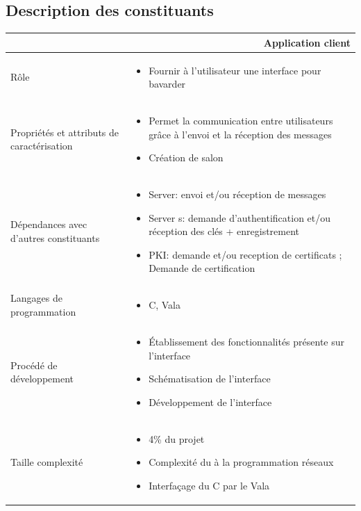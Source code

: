 \documentclass[a4paper,11pt,french]{article}
\begin{document}
\vspace{0.5cm}
\subsection{Description des constituants}
\begin{center}
	\vspace*{0.7cm}
	\begin{tabularx}{16cm}{|l|X|}
	\hline
	\multicolumn{2}{|r|}{\textbf{Application client}}\\
	\hline
	R\^ole &  \begin{itemize}\item Fournir à l'utilisateur une interface pour bavarder \end{itemize}\\
	\hline
	Propriétés et attributs de caractérisation & \begin{itemize}\item Permet la communication entre utilisateurs grâce à l'envoi et la réception des messages \item Création de salon \end{itemize}\\
	\hline
	Dépendances avec d'autres constituants & \begin{itemize}\item  Server: envoi et/ou réception de messages \item Server s: demande d'authentification et/ou réception  des clés + enregistrement\item PKI: demande et/ou reception de certificats ; Demande de certification\end{itemize}\\
	\hline
	Langages de programmation & \begin{itemize} \item C, Vala \end{itemize}\\
	\hline
	Procédé de développement & \begin{itemize}\item  \'Etablissement des fonctionnalités présente sur l'interface \item Schématisation de l'interface \item Développement de l'interface \end{itemize}\\
	\hline
	Taille complexité & \begin{itemize}\item 4\% du projet \item Complexité du à la programmation réseaux \item Interfa\c cage du C par le Vala\end{itemize}\\
	\hline
	\end{tabularx}
\end{center}
\end{document}
